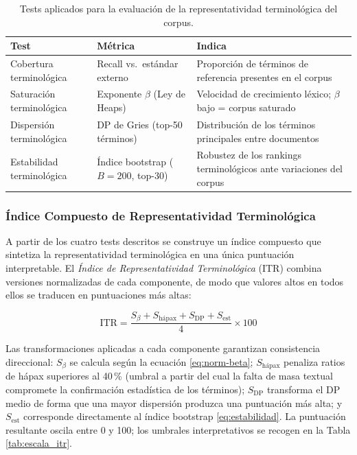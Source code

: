 \begin{table}[H]
\centering
\fontsize{10}{12}\selectfont
\begin{tabular}{>{\raggedright\arraybackslash}p{4.2cm}
                >{\raggedright\arraybackslash}p{4cm}
                >{\raggedright\arraybackslash}p{5.8cm}}
\toprule
\textbf{Test} & \textbf{Métrica} & \textbf{Indica} \\
\midrule
Cobertura terminológica
    & Recall vs.\ estándar externo
    & Proporción de términos de referencia presentes en el corpus \\
\addlinespace
Saturación terminológica
    & Exponente $\beta$ (Ley de Heaps)
    & Velocidad de crecimiento léxico; $\beta$ bajo = corpus saturado \\
\addlinespace
Dispersión terminológica
    & DP de Gries (top-50 términos)
    & Distribución de los términos principales entre documentos \\
\addlinespace
Estabilidad terminológica
    & Índice bootstrap ($B=200$, top-30)
    & Robustez de los rankings terminológicos ante variaciones del corpus \\
\bottomrule
\end{tabular}
\caption{Tests aplicados para la evaluación de la representatividad
         terminológica del corpus.}
\label{tab:tests-representatividad}
\end{table}


\subsubsection{Índice Compuesto de Representatividad Terminológica}
\label{subsubsec:ITR}

A partir de los cuatro tests descritos se construye un índice compuesto que
sintetiza la representatividad terminológica en una única puntuación
interpretable. El \textit{Índice de Representatividad Terminológica} (ITR)
combina versiones normalizadas de cada componente, de modo que valores altos
en todos ellos se traducen en puntuaciones más altas:

\begin{equation}
    \mathrm{ITR} = \frac{S_{\beta} + S_{\mathrm{hápax}}
                        + S_{\mathrm{DP}} + S_{\mathrm{est}}}{4}
                  \times 100
    \label{eq:itr}
\end{equation}

Las transformaciones aplicadas a cada componente garantizan consistencia
direccional: $S_\beta$ se calcula según la ecuación \eqref{eq:norm-beta};
$S_{\mathrm{hápax}}$ penaliza ratios de hápax superiores al 40\,\%
(umbral a partir del cual la falta de masa textual compromete la
confirmación estadística de los términos); $S_{\mathrm{DP}}$ transforma
el DP medio de forma que una mayor dispersión produzca una puntuación
más alta; y $S_{\mathrm{est}}$ corresponde directamente al índice
bootstrap \eqref{eq:estabilidad}. La puntuación resultante oscila entre
0 y 100; los umbrales interpretativos se recogen en la Tabla
\ref{tab:escala_itr}.

